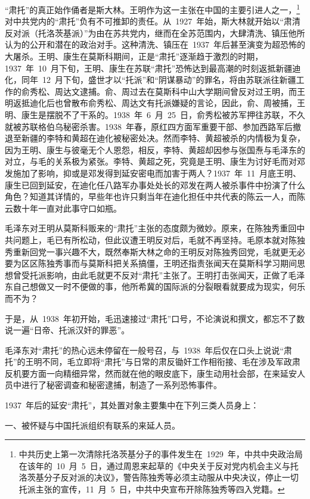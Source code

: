 “肃托”的真正始作俑者是斯大林。王明作为这一主张在中国的主要引进人之一，\footnote{中共历史上第一次清除托洛茨基分子的事件发生在~1929~年，中共中央政治局在该年的~10~月~5~日，通过周恩来起草的《中央关于反对党内机会主义与托洛茨基分子反对派的决议》，警告陈独秀等必须主动服从中央决议，停止一切托派主张的宣传，11~月~5~日，中共中央宣布开除陈独秀等四入党籍。}对中共党内的“肃托”负有不可推卸的责任。从~1927~年始，斯大林就开始以“肃清反对派（托洛茨基派）”为由在苏共党内，继而在全苏范围内，大肆清洗、镇压他所认为的公开和潜在的政治对手。这种清洗、镇压在~1937~年后甚至演变为超恐怖的大屠杀。王明、康生在莫斯科期间，正是“肃托”逐渐趋于激烈的时期，1937~年~10~月下旬，王明、康生在苏联“肃托”恐怖达到最高潮的时刻返抵新疆迪化，同年~12~月下旬，盛世才以“托派”和“阴谋暴动”的罪名，将由苏联派往新疆工作的俞秀松、周达文逮捕。俞、周过去在莫斯科中山大学期间曾反对过王明，而王明返抵迪化后也曾散布俞秀松、周达文有托派嫌疑的言论，因此，俞、周被捕，王明、康生是摆脱不了干系的。1938~年~6~月~25~日，俞秀松被苏军押往苏联，不久就被苏联格伯乌秘密杀害。1938~年春，原红四方面军重要干部、参加西路军后撤退至新疆的李特和黄超在迪化被秘密处决。然而李特、黄超被杀的内情极为复杂，因为王明、康生与彼毫无个人恩怨，相反，李特、黄超却因参与张国焘与毛泽东的对立，与毛的关系极为紧张。李特、黄超之死，究竟是王明、康生为讨好毛而对邓发施加了影响，抑或是邓发得到延安密电而加害于两人？1937~年~11~月底王明、康生已回到延安，在迪化任八路军办事处处长的邓发在两人被杀事件中扮演了什么角色？知道其详情的，早些年也许只剩当年在迪化担任中共代表的陈云一人，而陈云数十年一直对此事守口如瓶。

毛泽东对王明从莫斯科贩来的“肃托”主张的态度颇为微妙。原来，在陈独秀重回中共问题上，毛已有所松动，但此议遭王明反对后，毛就不再坚持。毛原本就对陈独秀重新回党一事兴趣不大，既然奉斯大林之命的王明反对陈独秀回党，毛就更无必要为区区陈独秀事而与莫斯科把关系搞僵，王明还指责张闻天在莫斯科学习期间思想曾受托派影响，由此毛就更不反对“肃托”主张了。王明打击张闻天，正做了毛泽东自己想做又一时不便做的事，他所希冀的国际派的分裂眼看就要成为现实，何乐而不为？

于是，从~1938~年初开始，毛迅速接过“肃托”口号，不论演说和撰文，都忘不了数说一遍“日帝、托派汉奸的罪恶”。

毛泽东对“肃托”的热心远未停留在一般号召，与~1938~年后仅在口头上说说“肃托”的王明不同，毛立即将“肃托”与日常的肃反锄奸工作相衔接、毛在涉及军政肃反机要方面一向精细异常，然而就在他的眼皮底下，康生动用社会部，在来延安人员中进行了秘密调查和秘密逮捕，制造了一系列恐怖事件。

1937~年后的延安“肃托”，其处置对象主要集中在下列三类人员身上：

一、被怀疑与中国托派组织有联系的来延人员。

